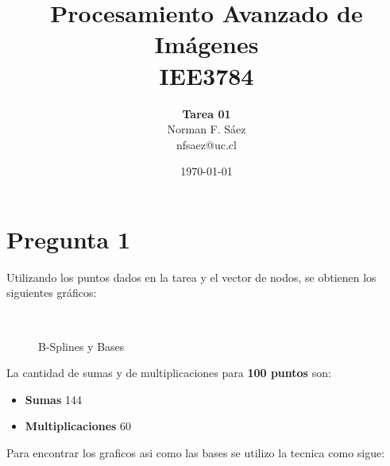 \documentclass[a4paper,10pt]{article}
\title{Procesamiento Avanzado de Imágenes\\IEE3784}
\author{\textbf{Tarea 01}\\Norman F. S\'aez\\nfsaez@uc.cl}
\date{\today}
\begin{document}
\maketitle
\section{Pregunta 1}
Utilizando los puntos dados en la tarea y el vector de nodos, se obtienen los siguientes gráficos:
\begin{figure}[ht!]
  \centering
  ~ 
  ~ 
  \caption{B-Splines y Bases}
  \label{fig:p1}
\end{figure}
La cantidad de sumas y de multiplicaciones para \textbf{100 puntos} son:
\begin{itemize}
\item \textbf{Sumas} 144
\item \textbf{Multiplicaciones} 60
\end{itemize} 
Para encontrar los graficos asi como las bases se utilizo la tecnica como sigue:
\end{document}

